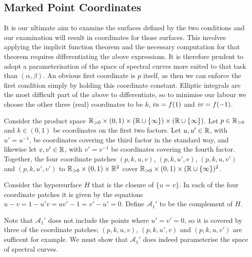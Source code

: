 \subsection{Marked Point Coordinates}
\label{sub:Reformulate}

It is our ultimate aim to examine the surfaces defined by the two conditions and our examination will result in coordinates for those surfaces. This involves applying the implicit function theorem and the necessary computation for that theorem requires differentiating the above expressions. It is therefore prudent to adopt a parameterisation of the space of spectral curves more suited to that task than $(α,β)$. An obvious first coordinate is $p$ itself, as then we can enforce the first condition simply by holding this coordinate constant. Elliptic integrals are the most difficult part of the above to differentiate, so to minimise our labour we choose the other three (real) coordinates to be $k$, $i u = f(1)$ and $i v = f(-1)$.

\begin{defn}\label{def:parameter space}
Consider the product space $\mathbb{R}_{>0} \times (0,1) \times (\mathbb{R}\cup\{\infty\}) \times (\mathbb{R}\cup\{\infty\})$. Let $p \in \mathbb{R}_{>0}$ and $k \in (0,1)$ be coordinates on the first two factors. Let $u, u' \in \mathbb{R}$, with $u' = u^{-1}$, be coordinates covering the third factor in the standard way, and likewise let $v, v' \in\mathbb{R}$, with $v' = v^{-1}$ be coordinates covering the fourth factor. Together, the four coordinate patches $(p,k,u,v)$, $(p,k,u',v)$, $(p,k,u,v')$ and $(p,k,u',v')$ to $\mathbb{R}_{>0} \times (0,1) \times \mathbb{R}^2$ cover $\mathbb{R}_{>0} \times (0,1) \times (\mathbb{R}\cup\{\infty\})^2$.

Consider the hypersurface $H$ that is the closure of $\{u=v\}$. In each of the four coordinate patches it is given by the equations $u-v = 1-u'v = uv'- 1 = v' - u' = 0$. Define $\mathcal{A}_1'$ to be the complement of $H$.
\end{defn}

Note that $\mathcal{A}_1'$ does not include the points where $u'=v'=0$, so it is covered by three of the coordinate patches; $(p,k,u,v)$, $(p,k,u',v)$ and $(p,k,u,v')$ are sufficent for example. We must show that $\mathcal{A}_1'$ does indeed parameterise the space of spectral curves.

